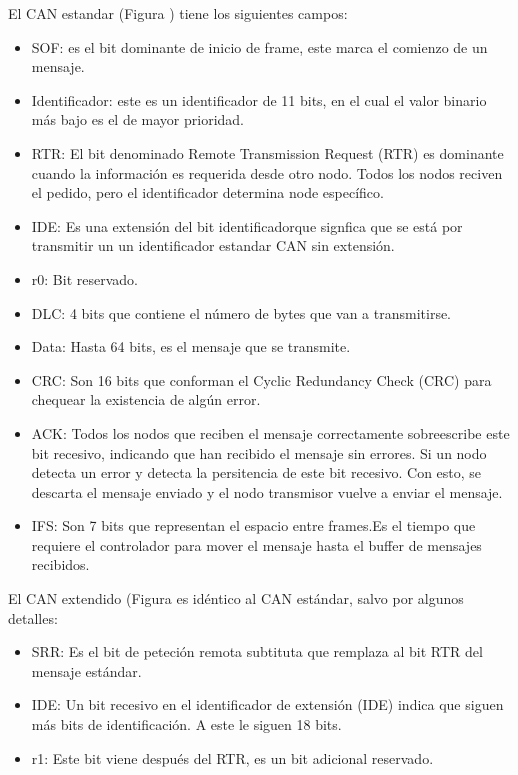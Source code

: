 El CAN estandar (Figura ) tiene los siguientes campos:
\begin{itemize}
  \item SOF: es el bit dominante de inicio de frame, este marca el comienzo de un mensaje.
  \item Identificador: este es un identificador de 11 bits, en el cual el valor binario más bajo es el de mayor prioridad.
  \item RTR: El bit denominado Remote Transmission Request (RTR) es dominante cuando la información es requerida desde otro nodo. Todos los nodos reciven el pedido, pero el identificador determina node específico.
  \item IDE: Es una extensión del bit identificadorque signfica que se está por transmitir un un identificador estandar CAN sin extensión.
  \item r0: Bit reservado.
  \item DLC: 4 bits que contiene el  número de bytes que van a transmitirse.
  \item Data: Hasta 64 bits, es el mensaje que se transmite.
  \item CRC: Son 16 bits que conforman el Cyclic Redundancy Check (CRC) para chequear la existencia de algún error.
  \item ACK: Todos los nodos que reciben el mensaje correctamente sobreescribe este bit recesivo, indicando que han recibido el mensaje sin errores. Si un nodo detecta un error y detecta la persitencia de este bit recesivo. Con esto, se descarta el mensaje enviado y el nodo transmisor vuelve a enviar el mensaje.
  \item IFS: Son 7 bits que representan el espacio entre frames.Es el tiempo que requiere el controlador para mover el mensaje hasta el buffer de mensajes recibidos.
\end{itemize}

El CAN extendido (Figura  es idéntico al CAN estándar, salvo por algunos detalles:
\begin{itemize}
  \item SRR: Es el bit de peteción remota subtituta que remplaza al bit RTR del mensaje estándar.
  \item IDE: Un bit recesivo en el identificador de extensión (IDE) indica que siguen más bits de identificación. A este le siguen 18 bits.
  \item r1: Este bit viene después del RTR, es un bit adicional reservado.
\end{itemize}

